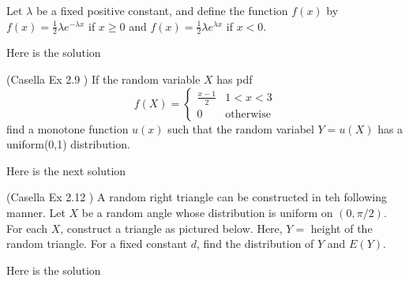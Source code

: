 \documentclass[12pt,letterpaper]{exam}
\begin{document}
\begin{questions}
	\question Let $\lambda$ be a fixed positive constant, and define the function $f(x)$ by $f(x) = \frac{1}{2} \lambda e^{-\lambda x}$ if $x \ge 0$ and $f(x) = \frac{1}{2} \lambda e^{\lambda x}$ if $x < 0$. 
	
	
	\begin{solution}
		Here is the solution
	\end{solution}
	
	\setcounter{question}{8}
	\question  (Casella Ex 2.9 ) If the random variable $X$ has pdf $$f(X) = \begin{cases}\frac{x-1}{2} & 1<x<3 \\ 0 & \text{otherwise} \end{cases}$$
	find a monotone function $u(x)$ such that the random variabel $Y = u(X)$ has a uniform(0,1) distribution.
	\begin{solution}
		Here is the next solution
	\end{solution}

	\setcounter{question}{11}
	\question (Casella Ex 2.12 ) A random right triangle can be constructed in teh following manner. Let $X$ be a random angle whose distribution is uniform on $(0, \pi / 2)$. For each $X$, construct a triangle as pictured below. Here, $Y =$ height of the random triangle. For a fixed constant $d$, find the distribution of $Y$ and $E(Y)$. 
	\begin{center}
	\end{center}
	
	\begin{solution}
		Here is the solution
	\end{solution}
	

\end{questions}
\end{document}
